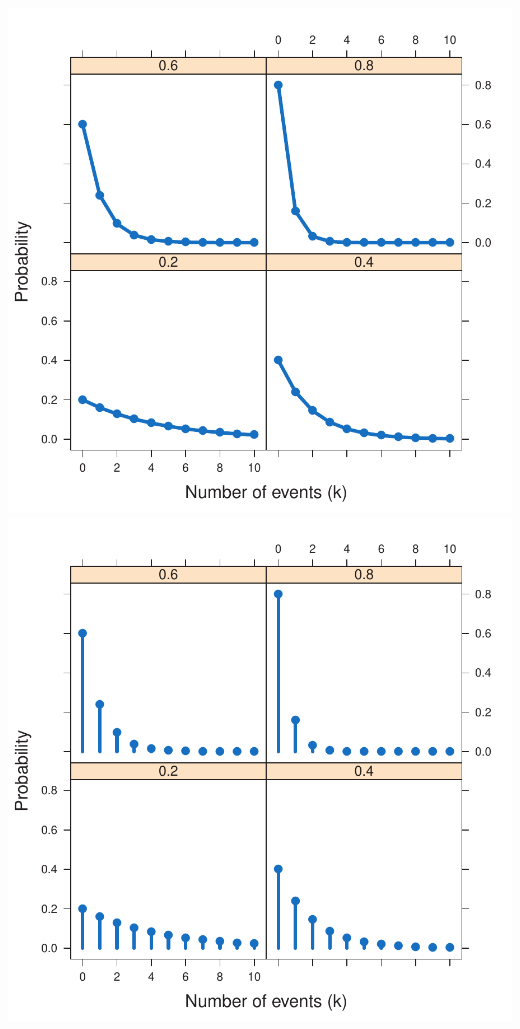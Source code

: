 \documentclass[10pt]{report}\usepackage[]{graphicx}\usepackage[]{color}
\newenvironment{knitrout}{}{} %
\renewenvironment{knitrout}{\small\renewcommand{\baselinestretch}{.85}}{} %
\begin{document}
\begin{Exercises}
\begin{enumerate}
\begin{ans}
\begin{knitrout}
\centerline{\includegraphics[width=.49\textwidth]{soln/fig/ex3_2a-1} 
\includegraphics[width=.49\textwidth]{soln/fig/ex3_2a-2} }



\end{knitrout}
    \end{ans}
    

\end{enumerate}
\end{Exercises}
\end{document}
